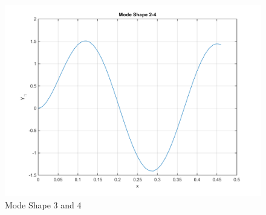 \documentclass[14pt,a4paper]{article}
\begin{document}
\begin{enumerate}
\begin{figure}[htp]
		\includegraphics[scale=0.4]{fn1_VB2_mode4.png}
		\caption{Mode Shape 3 and 4}
	\end{figure}	
\end{enumerate}
\end{document}
